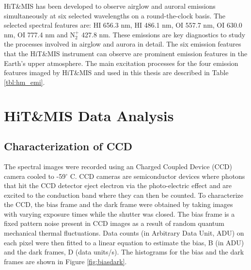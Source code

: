 \documentclass[crop=false,class=mitthesis,oneside,font=12pt]{standalone}
\begin{document}
HiT\&MIS has been developed to observe airglow and auroral emissions simultaneously at six selected wavelengths on a round-the-clock basis. The selected spectral features are: HI 656.3 nm, HI 486.1 nm, OI 557.7 nm, OI 630.0 nm, OI 777.4 nm and N$_2^+$ 427.8 nm. These emissions are key diagnostics to study the processes involved in airglow and aurora in detail. The six emission features that the HiT\&MIS instrument can observe are prominent emission features in the Earth’s upper atmosphere. The main excitation processes for the four emission features imaged by HiT\&MIS and used in this thesis are described in Table \ref{tbl:hm_emi}. 

\section{HiT\&MIS Data Analysis}
\subsection{Characterization of CCD }
The spectral images were recorded using an Charged Coupled Device (CCD) camera cooled to -59$^\circ$ C. CCD cameras are semiconductor devices where photons that hit the CCD detector eject electron via the photo-electric effect and are excited to the conduction band where they can then be counted. To characterize the CCD, the bias frame and the dark frame were obtained by taking images with varying exposure times while the shutter was closed. The bias frame is a fixed pattern noise present in CCD images as a result of random quantum mechanical thermal fluctuations. Data counts (in Arbitrary Data Unit, ADU) on each pixel were then fitted to a linear equation to estimate the bias, B (in ADU)  and the dark frames, D (data units/s). The histograms for the bias and the dark frames are shown in Figure \ref{fig:biasdark}.  
\end{document}
